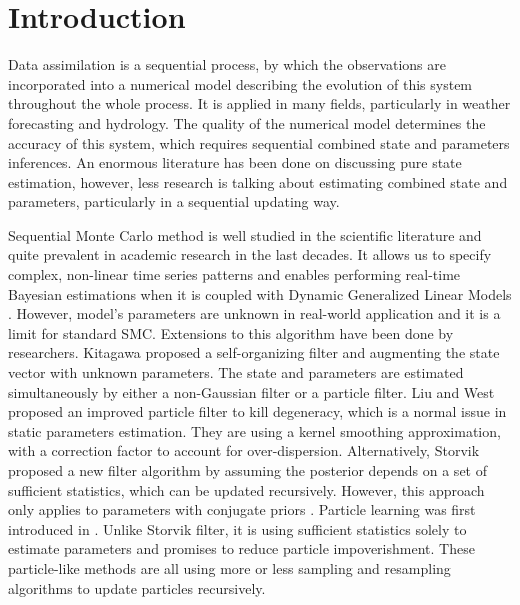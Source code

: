 
\section{Introduction}

Data assimilation is a sequential process, by which the observations are incorporated into a numerical model describing the evolution of this system throughout the whole process. It is applied in many fields, particularly in weather forecasting and hydrology. The quality of the numerical model determines the accuracy of this system, which requires sequential combined state and parameters inferences. An enormous literature has been done on discussing pure state estimation, however, less research is talking about estimating combined state and parameters, particularly in a sequential updating way. 

Sequential Monte Carlo method is well studied in the scientific literature and quite prevalent in academic research in the last decades. It allows us to specify complex, non-linear time series patterns and enables performing real-time Bayesian estimations when it is coupled with Dynamic Generalized Linear Models \cite{vieira2016online}. However, model's parameters are unknown in real-world application and it is a limit for standard SMC. Extensions to this algorithm have been done by researchers. Kitagawa \cite{kitagawa1998self} proposed a self-organizing filter and augmenting the state vector with unknown parameters. The state and parameters are estimated simultaneously by either a non-Gaussian filter or a particle filter. Liu and West \cite{liu2001combined} proposed an improved particle filter to kill degeneracy, which is a normal issue in static parameters estimation. They are using a kernel smoothing approximation, with a correction factor to account for over-dispersion. Alternatively, Storvik \cite{storvik2002particle} proposed a new filter algorithm by assuming the posterior depends on a set of sufficient statistics, which can be updated recursively. However, this approach only applies to parameters with conjugate priors \cite{stroud2016bayesian}. Particle learning was first introduced in \cite{carvalho2010particle}. Unlike Storvik filter, it is using sufficient statistics solely to estimate parameters and promises to reduce particle impoverishment. These particle-like methods are all using more or less sampling and resampling algorithms to update particles recursively. 

